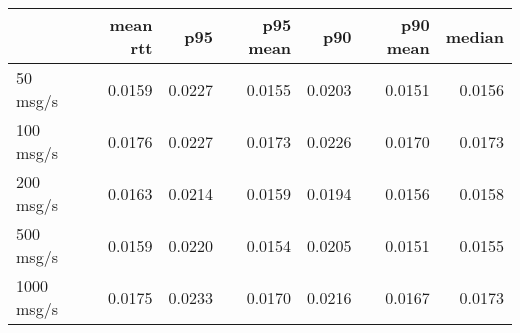 \begin{tabular}{l|rrrrrr}
\rowcolor{gray!50}
 & mean rtt & p95 & p95 mean & p90 & p90 mean & median\\\hline
50 msg/s & 0.0159 & 0.0227 & 0.0155 & 0.0203 & 0.0151 & 0.0156 \\
100 msg/s & 0.0176 & 0.0227 & 0.0173 & 0.0226 & 0.0170 & 0.0173 \\
200 msg/s & 0.0163 & 0.0214 & 0.0159 & 0.0194 & 0.0156 & 0.0158 \\
500 msg/s & 0.0159 & 0.0220 & 0.0154 & 0.0205 & 0.0151 & 0.0155 \\
1000 msg/s & 0.0175 & 0.0233 & 0.0170 & 0.0216 & 0.0167 & 0.0173 \\
\end{tabular}
